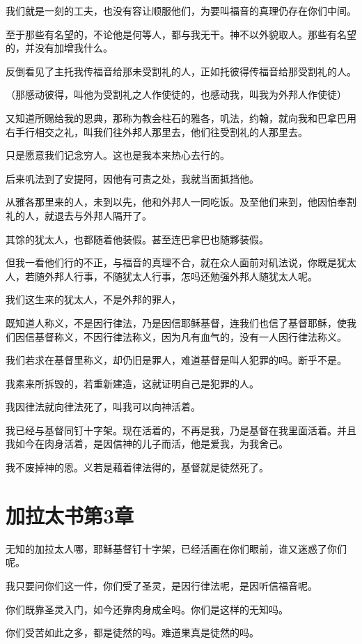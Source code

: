 \documentclass[12pt,oneside]{book}
\begin{document}
我们就是一刻的工夫，也没有容让顺服他们，为要叫福音的真理仍存在你们中间。

至于那些有名望的，不论他是何等人，都与我无干。神不以外貌取人。那些有名望的，并没有加增我什么。

反倒看见了主托我传福音给那未受割礼的人，正如托彼得传福音给那受割礼的人。

（那感动彼得，叫他为受割礼之人作使徒的，也感动我，叫我为外邦人作使徒）

又知道所赐给我的恩典，那称为教会柱石的雅各，叽法，约翰，就向我和巴拿巴用右手行相交之礼，叫我们往外邦人那里去，他们往受割礼的人那里去。

只是愿意我们记念穷人。这也是我本来热心去行的。

后来叽法到了安提阿，因他有可责之处，我就当面抵挡他。

从雅各那里来的人，未到以先，他和外邦人一同吃饭。及至他们来到，他因怕奉割礼的人，就退去与外邦人隔开了。

其馀的犹太人，也都随着他装假。甚至连巴拿巴也随夥装假。

但我一看他们行的不正，与福音的真理不合，就在众人面前对矶法说，你既是犹太人，若随外邦人行事，不随犹太人行事，怎吗还勉强外邦人随犹太人呢。

我们这生来的犹太人，不是外邦的罪人，

既知道人称义，不是因行律法，乃是因信耶稣基督，连我们也信了基督耶稣，使我们因信基督称义，不因行律法称义，因为凡有血气的，没有一人因行律法称义。

我们若求在基督里称义，却仍旧是罪人，难道基督是叫人犯罪的吗。断乎不是。

我素来所拆毁的，若重新建造，这就证明自己是犯罪的人。

我因律法就向律法死了，叫我可以向神活着。

我已经与基督同钉十字架。现在活着的，不再是我，乃是基督在我里面活着。并且我如今在肉身活着，是因信神的儿子而活，他是爱我，为我舍己。

我不废掉神的恩。义若是藉着律法得的，基督就是徒然死了。

\chapter{加拉太书第3章}
无知的加拉太人哪，耶稣基督钉十字架，已经活画在你们眼前，谁又迷惑了你们呢。

我只要问你们这一件，你们受了圣灵，是因行律法呢，是因听信福音呢。

你们既靠圣灵入门，如今还靠肉身成全吗。你们是这样的无知吗。

你们受苦如此之多，都是徒然的吗。难道果真是徒然的吗。
\end{document}
